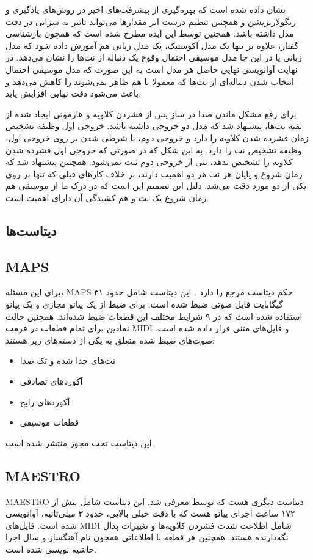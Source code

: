 نشان داده شده است
\cite{kelz2016potential}
که بهره‌گیری از پیشرفت‌های اخیر در روش‌های یادگیری و ریگولاریزیشن و همچنین
تنظیم درست ابر مقدارها می‌تواند تاثیر به سزایی در دقت مدل داشته باشد. همچنین
توسط
\cite{sigtia2016end}
این ایده مطرح شده است که همچون بازشناسی گفتار، علاوه بر تنها یک مدل آکوستیک،
یک مدل زبانی هم آموزش داده شود که مدل زبانی یا در این جا مدل موسیقی احتمال
وقوع یک دنباله از نت‌ها را نشان می‌دهد. در  نهایت آوانویسی نهایی حاصل هر مدل
است به این صورت که مدل موسیقی احتمال انتخاب شدن دنباله‌ای از نت‌ها که معمولا
با هم ظاهر نمی‌شوند را کاهش می‌دهد و باعث می‌شود دقت نهایی افزایش یابد.

برای رفع مشکل ماندن صدا در ساز پس از فشردن کلاویه و هارمونی ایجاد شده از بقیه
نت‌ها، پیشنهاد شد
\cite{hawthorne2017onsets}
که مدل دو خروجی داشته باشد. خروجی اول وظیفه تشخیص زمان فشرده شدن کلاویه را
دارد و خروجی دوم، با شرطی شدن بر روی خروجی اول، وظیفه تشخیص نت را دارد. به این
شکل که در صورتی که خروجی اول فشرده شدن کلاویه را تشخیص ندهد، نتی از خروجی دوم
ثبت نمی‌شود. همچنین پیشنهاد شد که زمان شروع و پایان هر نت هر دو اهمیت دارند،
بر خلاف کارهای قبلی که تنها بر روی یکی از دو مورد دقت می‌شد. دلیل این تصمیم
این است که در درک ما از موسیقی هم زمان شروع یک نت و هم کشیدگی آن دارای اهمیت
است.

\subsection{دیتاست‌ها}
\subsection{MAPS}
برای این مسئله، MAPS
حکم دیتاست مرجع را دارد
\cite{emiya2010multipitch}.
این دیتاست شامل حدود ۳۱ گیگابایت فایل صوتی ضبط شده‌ است. برای ضبط از یک
پیانو مجازی و یک پیانو
استفاده شده است که در ۹ شرایط مختلف این قطعات ضبط شده‌اند. همچنین حالت نمادین
برای تمام قطعات در فرمت
MIDI
و فایل‌های متنی قرار داده شده است. صوت‌های ضبط شده متعلق به یکی از دسته‌های
زیر هستند:
\begin{itemize}
	\item نت‌های جدا شده و تک صدا
	\item آکوردهای تصادفی
	\item آکوردهای رایج
	\item قطعات موسیقی
\end{itemize}

این دیتاست تحت مجوز
منتشر شده‌ است.

\subsection{MAESTRO}
MAESTRO%
دیتاست دیگری هست که توسط
\cite{hawthorne2018enabling}
معرفی شد. این دیتاست شامل بیش از ۱۷۲ ساعت اجرای پیانو هست که با دقت خیلی بالایی،
حدود ۳ میلی‌ثانیه، آوانویسی شده است. فایل‌های
MIDI
شامل اطلاعت شدت فشردن کلاویه‌ها و تغییرات پدال نگه‌دارنده هستند. همچنین هر قطعه با اطلاعاتی
همچون نام آهنگساز و سال اجرا حاشیه نویسی شده است.

